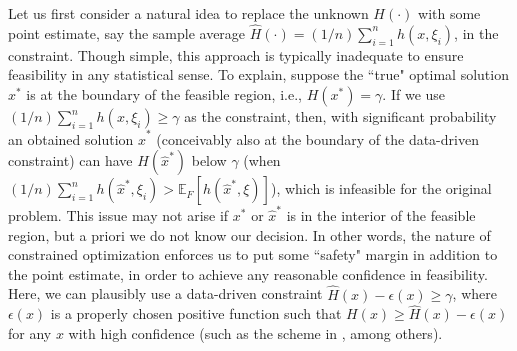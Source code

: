 \documentclass[mnsc,blindrev]{informs4} %
\begin{document}
Let us first consider a natural idea to replace the unknown $H(\cdot)$ with some point estimate, say the sample average $\hat H(\cdot)=(1/n)\sum_{i=1}^nh(x,\xi_i)$, in the constraint. Though simple, this approach is typically inadequate to ensure feasibility in any statistical sense. To explain, suppose the ``true" optimal solution $x^*$ is at the boundary of the feasible region, i.e., $H(x^*)=\gamma$. If we use $(1/n)\sum_{i=1}^nh(x,\xi_i)\geq\gamma$ as the constraint, then, with significant probability an obtained solution $\hat x^*$ (conceivably also at the boundary of the data-driven constraint) can have $H(\hat x^*)$ below $\gamma$  (when $(1/n)\sum_{i=1}^nh(\hat x^*,\xi_i)>\mathbb E_F[h(\hat x^*,\xi)]$), which is infeasible for the original problem. This issue may not arise if $x^*$ or $\hat x^*$ is in the interior of the feasible region, but a priori we do not know our decision. In other words, the nature of constrained optimization enforces us to put some ``safety" margin in addition to the point estimate, in order to achieve any reasonable confidence in feasibility. Here, we can plausibly use a data-driven constraint $\hat H(x)-\epsilon(x)\geq\gamma$, where $\epsilon(x)$ is a properly chosen positive function such that $H(x)\geq\hat H(x)-\epsilon(x)$ for any $x$ with high confidence (such as the scheme in \cite{wang2008sample}, among others).





\end{document}
